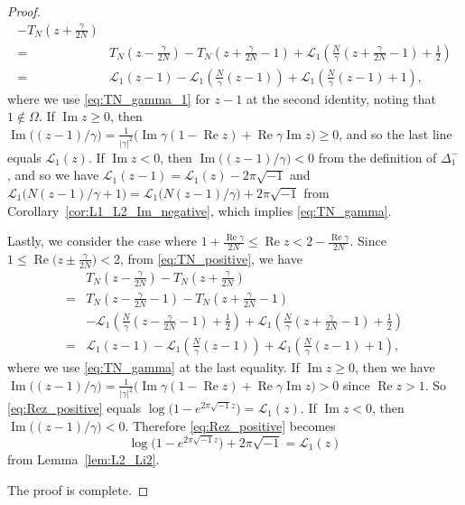 \documentclass[a4paper,dvipdfmx]{amsart}
\theoremstyle{plain}
\theoremstyle{definition}
\theoremstyle{remark}
\renewcommand{\L}{\mathcal{L}}
\renewcommand{\Re}{\operatorname{Re}}
\renewcommand{\Im}{\operatorname{Im}}
\renewcommand{\i}{\sqrt{-1}}
\numberwithin{equation}{section}
\begin{document}
\begin{proof}
\begin{align*}
  -
  T_{N}\left(z+\frac{\gamma}{2N}\right)
  \\
  =&
  T_{N}\left(z-\frac{\gamma}{2N}\right)
  -
  T_{N}\left(z+\frac{\gamma}{2N}-1\right)
  +
  \L_1\left(\frac{N}{\gamma}\left(z+\frac{\gamma}{2N}-1\right)+\frac{1}{2}\right)
  \\
  =&
  \L_1(z-1)-\L_1\left(\frac{N}{\gamma}(z-1)\right)
  +
  \L_1\left(\frac{N}{\gamma}(z-1)+1\right),
\end{align*}
where we use \eqref{eq:TN_gamma_1} for $z-1$ at the second identity, noting that $1\not\in\Omega$.
If $\Im{z}\ge0$, then $\Im\bigl((z-1)/\gamma\bigr)=\frac{1}{|\gamma|^2}\bigl(\Im\gamma(1-\Re{z})+\Re\gamma\Im{z}\bigr)\ge0$, and so the last line equals $\L_1(z)$.
If $\Im{z}<0$, then $\Im\bigl((z-1)/\gamma\bigr)<0$ from the definition of $\Delta_{1}^{-}$, and so we have $\L_1(z-1)=\L_1(z)-2\pi\i$ and $\L_1\bigl(N(z-1)/\gamma+1\bigr)=\L_1\bigl(N(z-1)/\gamma\bigr)+2\pi\i$ from Corollary~\ref{cor:L1_L2_Im_negative}, which implies \eqref{eq:TN_gamma}.
\par
Lastly, we consider the case where $1+\frac{\Re\gamma}{2N}\le\Re{z}<2-\frac{\Re\gamma}{2N}$.
Since $1\le\Re\bigl(z\pm\frac{\gamma}{2N}\bigr)<2$, from \eqref{eq:TN_positive}, we have
\begin{equation}\label{eq:Rez_positive}
\begin{split}
  &T_{N}\left(z-\frac{\gamma}{2N}\right)
  -
  T_{N}\left(z+\frac{\gamma}{2N}\right)
  \\
  =&
  T_{N}\left(z-\frac{\gamma}{2N}-1\right)
  -
  T_{N}\left(z+\frac{\gamma}{2N}-1\right)
  \\
  &
  -
  \L_1\left(\frac{N}{\gamma}\left(z-\frac{\gamma}{2N}-1\right)+\frac{1}{2}\right)
  +
  \L_1\left(\frac{N}{\gamma}\left(z+\frac{\gamma}{2N}-1\right)+\frac{1}{2}\right)
  \\
  =&
  \L_1(z-1)
  -
  \L_1\left(\frac{N}{\gamma}(z-1)\right)
  +
  \L_1\left(\frac{N}{\gamma}(z-1)+1\right),
\end{split}
\end{equation}
where we use \eqref{eq:TN_gamma} at the last equality.
If $\Im{z}\ge0$, then we have $\Im\bigl((z-1)/\gamma\bigr)=\frac{1}{|\gamma|^2}\bigl(\Im\gamma(1-\Re{z})+\Re\gamma\Im{z}\bigr)>0$ since $\Re{z}>1$.
So \eqref{eq:Rez_positive} equals $\log\big(1-e^{2\pi\i z}\bigr)=\L_1(z)$.
If $\Im{z}<0$, then $\Im\bigl((z-1)/\gamma\bigr)<0$.
Therefore \eqref{eq:Rez_positive} becomes
\begin{equation*}
  \log\bigl(1-e^{2\pi\i z}\bigr)
  +2\pi\i
  =
  \L_1(z)
\end{equation*}
from Lemma~\ref{lem:L2_Li2}.
\par
The proof is complete.
\end{proof}
\end{document}
